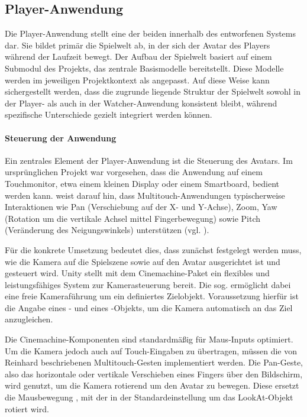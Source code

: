 \subsection{Player-Anwendung}

Die Player-Anwendung stellt eine der beiden  innerhalb des entworfenen Systems dar. Sie bildet primär die Spielwelt ab, in der sich der Avatar des Players während der Laufzeit bewegt. Der Aufbau der Spielwelt basiert auf einem Submodul des Projekts, das zentrale Basismodelle bereitstellt. Diese Modelle werden im jeweiligen Projektkontext als  angepasst. Auf diese Weise kann sichergestellt werden, dass die zugrunde liegende Struktur der Spielwelt sowohl in der Player- als auch in der Watcher-Anwendung konsistent bleibt, während spezifische Unterschiede gezielt integriert werden können.

\paragraph{Steuerung der Anwendung}

Ein zentrales Element der Player-Anwendung ist die Steuerung des Avatars. Im ursprünglichen Projekt war vorgesehen, dass die Anwendung auf einem Touchmonitor, etwa einem kleinen Display oder einem Smartboard, bedient werden kann. \cite{reinhard_augmented_2022} weist darauf hin, dass Multitouch-Anwendungen typischerweise Interaktionen wie Pan (Verschiebung auf der X- und Y-Achse), Zoom, Yaw (Rotation um die vertikale Achsel mittel Fingerbewegung) sowie Pitch (Veränderung des Neigungswinkels) unterstützen (vgl. \citealp[S. 66ff]{reinhard_augmented_2022}).

Für die konkrete Umsetzung bedeutet dies, dass zunächst festgelegt werden muss, wie die Kamera auf die Spielszene sowie auf den Avatar ausgerichtet ist und gesteuert wird. Unity stellt mit dem Cinemachine-Paket ein flexibles und leistungsfähiges System zur Kamerasteuerung bereit. Die sog.  ermöglicht dabei eine freie Kameraführung um ein definiertes Zielobjekt. Voraussetzung hierfür ist die Angabe eines - und eines -Objekts, um die Kamera automatisch an das Ziel anzugleichen.

Die Cinemachine-Komponenten sind standardmäßig für Maus-Inputs optimiert. Um die Kamera jedoch auch auf Touch-Eingaben zu übertragen, müssen die von Reinhard beschriebenen Multitouch-Gesten implementiert werden. Die Pan-Geste, also das horizontale oder vertikale Verschieben eines Fingers über den Bildschirm, wird genutzt, um die Kamera rotierend um den Avatar zu bewegen. Diese ersetzt die Mausbewegung , mit der in der Standardeinstellung um das LookAt-Objekt rotiert wird.

